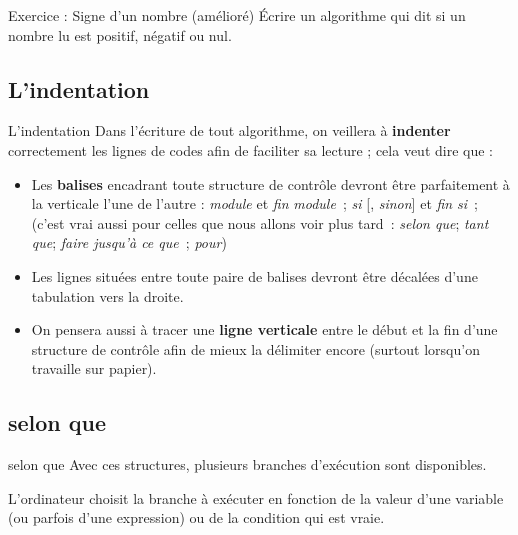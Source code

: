 \begin{frame}{Exercice : Signe d'un nombre (amélioré)}
	Écrire un algorithme qui dit si un nombre lu est positif, 
	négatif ou nul.
\end{frame}

\subsection{L'indentation}

\begin{frame}{L'indentation}
	Dans l’écriture de tout algorithme, on veillera à \textbf{indenter}
	correctement les lignes de codes afin de faciliter sa lecture ; cela
	veut dire que :

	\begin{itemize}
		\item {
		Les \textbf{balises} encadrant toute structure de contrôle devront être
		parfaitement à la verticale l’une de l’autre : \textit{module}
		et \textit{fin} \textit{module~}; \textit{si}
		[, \textit{sinon}] et \textit{fin}
		\textit{si~}; (c'est vrai aussi pour celles que nous allons voir plus tard~:
		\textit{selon que}; \textit{tant que}; 
		\textit{faire jusqu'à ce que~}; \textit{pour})}
		\item {
		Les lignes situées entre toute paire de balises devront être décalées
		d'une tabulation vers la droite.}
		\item {
		On pensera aussi à tracer une \textbf{ligne verticale} entre le début et la
		fin d'une structure de contrôle afin de mieux la
		délimiter encore (surtout lorsqu'on travaille sur papier). }
	\end{itemize}

\end{frame}

\subsection{selon que}

\begin{frame}{selon que}
	Avec ces structures, plusieurs branches d'exécution
	sont disponibles. 
	
	\bigskip
	
	L'ordinateur choisit la branche à
	exécuter en fonction de la valeur d'une variable 
	(ou parfois d'une expression) ou de
	la condition qui est vraie.
\end{frame}

